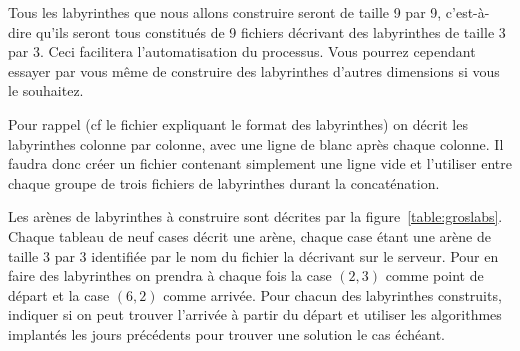 \documentclass[a4paper]{article}
\newenvironment{enseignants}[1]{\noindent\color{blue}{\bf #1}}{}
\begin{document}
Tous les labyrinthes que nous allons construire seront de taille 9 par 9, c'est-à-dire qu'ils seront tous constitués de 9 fichiers décrivant des labyrinthes de taille 3 par 3. Ceci facilitera l'automatisation du processus. Vous pourrez cependant essayer par vous même de construire des labyrinthes d'autres dimensions si vous le souhaitez.

\begin{enseignants}{Attention}
Pour rappel (cf le fichier expliquant le format des labyrinthes) on décrit les labyrinthes colonne par colonne, avec une ligne de blanc après chaque colonne. Il faudra donc créer un fichier contenant simplement une ligne vide et l'utiliser entre chaque groupe de trois fichiers de labyrinthes durant la concaténation.
\end{enseignants}

Les arènes de labyrinthes à construire sont décrites par la figure~\ref{table:groslabs}.
Chaque tableau de neuf cases décrit une arène, chaque case étant une arène de taille 3 par 3 identifiée par le nom du fichier la décrivant sur le serveur.
Pour en faire des labyrinthes on prendra à chaque fois la case $(2,3)$ comme point de départ et la case $(6,2)$ comme arrivée.
Pour chacun des labyrinthes construits, indiquer si on peut trouver l'arrivée à partir du départ et utiliser les algorithmes implantés les jours précédents pour trouver une solution le cas échéant.
\end{document}
